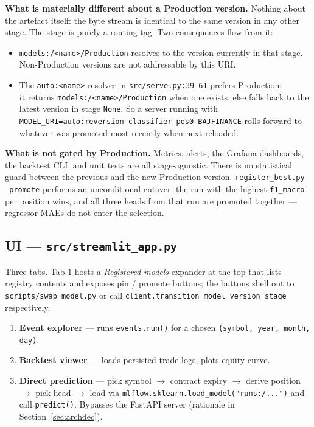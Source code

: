 \documentclass[11pt,a4paper]{article}
\begin{document}
\textbf{What is materially different about a Production version.} Nothing about the artefact itself: the byte stream is identical to the same version in any other stage. The stage is purely a routing tag. Two consequences flow from it:

\begin{itemize}[leftmargin=1.5em,itemsep=0pt]
  \item \texttt{models:/<name>/Production} resolves to the version currently in that stage. Non-Production versions are not addressable by this URI.
  \item The \texttt{auto:<name>} resolver in \texttt{src/serve.py:39--61} prefers Production: 
  \\
  it returns \texttt{models:/<name>/Production} when one exists, else falls back to the latest version in stage \texttt{None}. So a server running with \texttt{MODEL\_URI=auto:reversion-classifier-pos0-BAJFINANCE} rolls forward to whatever was promoted most recently when next reloaded.
\end{itemize}

\textbf{What is not gated by Production.} Metrics, alerts, the Grafana dashboards, the backtest CLI, and unit tests are all stage-agnostic. There is no statistical guard between the previous and the new Production version. \texttt{register\_best.py --promote} performs an unconditional cutover: the run with the highest \texttt{f1\_macro} per position wins, and all three heads from that run are promoted together --- regressor MAEs do not enter the selection.

\subsection{UI --- \texttt{src/streamlit\_app.py}}
Three tabs. Tab 1 hosts a \emph{Registered models} expander at the top that lists registry contents and exposes pin / promote buttons; the buttons shell out to \texttt{scripts/swap\_model.py} or call \texttt{client.transition\_model\_version\_stage} respectively.
\begin{enumerate}[leftmargin=1.5em,itemsep=0pt]
  \item \textbf{Event explorer} --- runs \texttt{events.run()} for a chosen \texttt{(symbol, year, month, day)}.
  \item \textbf{Backtest viewer} --- loads persisted trade logs, plots equity curve.
  \item \textbf{Direct prediction} --- pick symbol $\to$ contract expiry $\to$ derive position $\to$ pick head $\to$ load via \texttt{mlflow.sklearn.load\_model("runs:/...")} and call \texttt{predict()}. Bypasses the FastAPI server (rationale in Section~\ref{sec:archdec}).
\end{enumerate}
\end{document}
